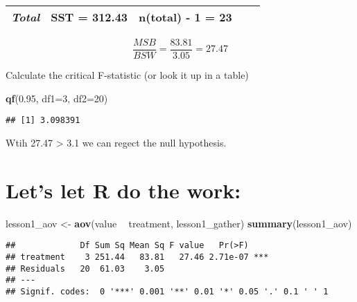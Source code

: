 \documentclass[]{book}
\newenvironment{Shaded}{\begin{snugshade}}{\end{snugshade}}
\newcommand{\DataTypeTok}[1]{\textcolor[rgb]{0.13,0.29,0.53}{#1}}
\newcommand{\DecValTok}[1]{\textcolor[rgb]{0.00,0.00,0.81}{#1}}
\newcommand{\FloatTok}[1]{\textcolor[rgb]{0.00,0.00,0.81}{#1}}
\newcommand{\KeywordTok}[1]{\textcolor[rgb]{0.13,0.29,0.53}{\textbf{#1}}}
\newcommand{\NormalTok}[1]{#1}
\newcommand{\OperatorTok}[1]{\textcolor[rgb]{0.81,0.36,0.00}{\textbf{#1}}}
\newcommand{\StringTok}[1]{\textcolor[rgb]{0.31,0.60,0.02}{#1}}
\theoremstyle{definition}
\theoremstyle{definition}
\theoremstyle{definition}
\theoremstyle{remark}
\begin{document}
\begin{longtable}[]{@{}lcccc@{}}
\begin{minipage}[t]{0.19\columnwidth}\raggedright
\emph{Total}\strut
\end{minipage} & \begin{minipage}[t]{0.19\columnwidth}\centering
SST = 312.43\strut
\end{minipage} & \begin{minipage}[t]{0.22\columnwidth}\centering
n(total) - 1 = 23\strut
\end{minipage} & \begin{minipage}[t]{0.17\columnwidth}\centering
\strut
\end{minipage} & \begin{minipage}[t]{0.08\columnwidth}\centering
\strut
\end{minipage}\tabularnewline
\bottomrule
\end{longtable}

\[ \frac {MSB} {BSW} = \frac {83.81} {3.05} = 27.47 \]

Calculate the critical F-statistic (or look it up in a table)

\begin{Shaded}
\begin{Highlighting}[]
\KeywordTok{qf}\NormalTok{(}\FloatTok{0.95}\NormalTok{, }\DataTypeTok{df1=}\DecValTok{3}\NormalTok{, }\DataTypeTok{df2=}\DecValTok{20}\NormalTok{) }
\end{Highlighting}
\end{Shaded}

\begin{verbatim}
## [1] 3.098391
\end{verbatim}

Wtih 27.47 \textgreater{} 3.1 we can regect the null hypothesis.

\hypertarget{lets-let-r-do-the-work}{%
\section{Let's let R do the work:}\label{lets-let-r-do-the-work}}

\begin{Shaded}
\begin{Highlighting}[]
\NormalTok{lesson1_aov <-}\StringTok{ }\KeywordTok{aov}\NormalTok{(value }\OperatorTok{~}\StringTok{ }\NormalTok{treatment, lesson1_gather)}
\KeywordTok{summary}\NormalTok{(lesson1_aov)}
\end{Highlighting}
\end{Shaded}

\begin{verbatim}
##             Df Sum Sq Mean Sq F value   Pr(>F)    
## treatment    3 251.44   83.81   27.46 2.71e-07 ***
## Residuals   20  61.03    3.05                     
## ---
## Signif. codes:  0 '***' 0.001 '**' 0.01 '*' 0.05 '.' 0.1 ' ' 1
\end{verbatim}
\end{document}
